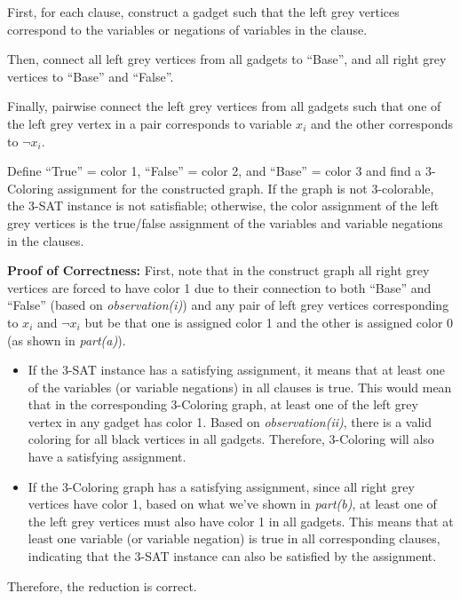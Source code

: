 \documentclass[11pt]{article}
\theoremstyle{definition}
\theoremstyle{remark}
\begin{document}
\begin{enumerate}
First, for each clause, construct a gadget such that the left grey vertices correspond to the variables or negations of variables in the clause.

Then, connect all left grey vertices from all gadgets to ``Base'', and all right grey vertices to ``Base'' and ``False''. 

Finally, pairwise connect the left grey vertices from all gadgets such that one of the left grey vertex in a pair corresponds to variable $x_i$ and the other corresponds to $\neg x_i$. 

Define ``True'' = color 1, ``False'' = color 2, and ``Base'' = color 3 and find a 3-Coloring assignment for the constructed graph. If the graph is not 3-colorable, the 3-SAT instance is not satisfiable; otherwise, the color assignment of the left grey vertices is the true/false assignment of the variables and variable negations in the clauses.

\textbf{Proof of Correctness:} First, note that in the construct graph all right grey vertices are forced to have color 1 due to their connection to both ``Base'' and ``False'' (based on \textit{observation(i)}) and any pair of left grey vertices corresponding to $x_i$ and $\neg x_i$ but be that one is assigned color 1 and the other is assigned color 0 (as shown in \textit{part(a)}).
\begin{itemize}
\item If the 3-SAT instance has a satisfying assignment, it means that at least one of the variables (or variable negations) in all clauses is true. This would mean that in the corresponding 3-Coloring graph, at least one of the left grey vertex in any gadget has color 1. Based on \textit{observation(ii)}, there is a valid coloring for all black vertices in all gadgets. Therefore, 3-Coloring will also have a satisfying assignment.

\item If the 3-Coloring graph has a satisfying assignment, since all right grey vertices have color 1, based on what we've shown in \textit{part(b)}, at least one of the left grey vertices must also have color 1 in all gadgets. This means that at least one variable (or variable negation) is true in all corresponding clauses, indicating that the 3-SAT instance can also be satisfied by the assignment.
\end{itemize}

Therefore, the reduction is correct.
\end{enumerate}
\clearpage
\end{document}
